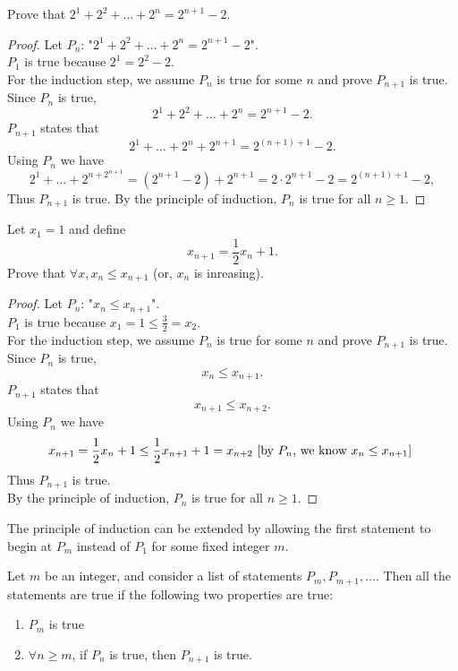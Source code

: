 \documentclass[math1010-lecture-notes]{subfiles}
\begin{document}
\begin{example}
  Prove that $2^{1}+2^2+\ldots+2^{n}=2^{n+1}-2$.
\end{example}

\begin{proof}
  Let $P_n$: "$2^{1}+2^2+\ldots+2^{n}=2^{n+1}-2$".\\
  $P_1$ is true because $2^{1}=2^2-2$. \\
  For the induction step, we assume $P_n$ is true for some  $n$ and prove $P_{n+1}$ is true. Since
   $P_n$ is true,  \[
   2^{1}+2^2+\ldots+2^{n} = 2^{n+1}-2
 .\]  $P_{n+1}$ states that  \[
 2^{1}+\ldots+2^{n}+2^{n+1} = 2^{\left( n+1 \right) +1}-2
 .\] Using $P_n$ we have  \[
 2^1+\ldots+2^{n + 2^{n+1}} = \left( 2^{n+1}-2 \right) +2^{n+1} = 2\cdot 2^{n+1}-2=2^{\left( n+1
 \right) +1}-2
 ,\] Thus $P_{n+1}$ is true. 
 By the principle of induction, $P_n$ is true for all  $n\ge 1$.
\end{proof}


\begin{example}
  Let $x_1=1$ and define \[
    x_{n+1}=\frac{1}{2}x_n+1
  .\] 
  Prove that $\forall x, x_n\le x_{n+1}$ (or, $x_n$ is inreasing).
\end{example}

\begin{proof}[Proof]
  Let $P_n$: "$x_n\le x_{n+1}$". \\
  $P_1$ is true because $x_1=1\le \frac{3}{2}=x_2$.\\
  For the induction step, we assume $P_n$ is true for some  $n$ and prove $P_{n+1}$ is true. Since
  $P_n$ is true,  \[
    x_n \le x_{n+1}
  .\] $P_{n+1}$ states that  \[
  x_{n+1} \le x_{n+2}
.\] Using $P_n$ we have  \[
x_{n+1} = \frac{1}{2}x_n+1\le \frac{1}{2}x_{n+1}+1=x_{n+2} \hfill~\text{[by $P_n$, we know $x_n\le x_{n+1}$]}~
\] Thus $P_{n+1}$ is true.\\
By the principle of induction, $P_n$ is true for all $n\ge 1$.
\end{proof}

The principle of induction can be extended by allowing the first statement to begin at $P_m$ instead
of  $P_1$ for some fixed integer $m$.

 \begin{theorem}{}
   Let $m$ be an integer, and consider a list of statements $P_m,P_{m+1},\ldots$. Then all the
   statements are true if the following two properties are true:
   \begin{enumerate}
     \item $P_m$ is true
     \item  $\forall n\ge m$, if $P_n$ is true, then  $P_{n+1}$ is true.
   \end{enumerate}
\end{theorem}
\end{document}
